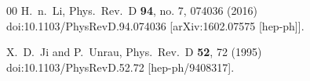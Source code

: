 \begin{thebibliography}{00}
	H.~n.~Li,
	Phys.\ Rev.\ D {\bf 94}, no. 7, 074036 (2016)
	doi:10.1103/PhysRevD.94.074036
	[arXiv:1602.07575 [hep-ph]].


	X.~D.~Ji and P.~Unrau,
	Phys.\ Rev.\ D {\bf 52}, 72 (1995)
	doi:10.1103/PhysRevD.52.72
	[hep-ph/9408317].

\end{thebibliography}
